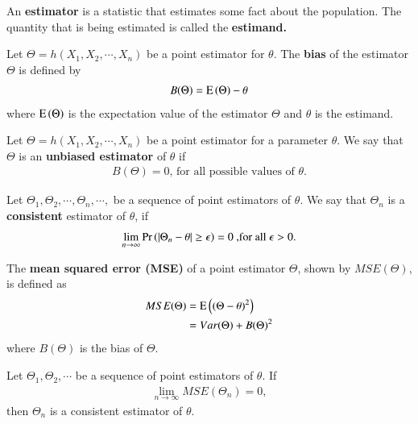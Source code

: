 \begin{definition}
    An \textbf{estimator} is a statistic that estimates some fact about the population.
    The quantity that is being estimated is called the \textbf{estimand.} 
    \end{definition}
    \begin{definition}
    Let $ \Theta = h(X_1,X_2, \cdots, X_n) $  be a point estimator for $ \theta$. The \textbf{bias} of the estimator $ \Theta $ is defined by 
    \begin{align}
        B(\Theta ) = \text{E}\left( \Theta \right) - \theta
    \end{align}
    where $ \text{E}\left( \Theta \right)$ is the expectation value of the estimator $ \Theta $ and $ \theta$ is the estimand.
    \end{definition}
        \begin{definition}
        Let $\Theta = h(X_1,X_2, \cdots , X_n) $ be a point estimator for a parameter $ \theta $. We say that $ \Theta $ is an \textbf{unbiased estimator} of $ \theta $ if
        \begin{align}
           B(\Theta )= 0 \text{, for all possible values of $\theta$.}
        \end{align}
        \end{definition} 
    \begin{definition}
    Let $ \Theta_1,\Theta_2, \cdots, \Theta_n , \cdots, $  be a sequence of point estimators of $ \theta $. We say that $ \Theta_n $ is a \textbf{consistent} estimator of $ \theta $, if 
    \begin{align}
        \lim_{n\to\infty} \Pr\left(| \Theta_n - \theta | \ge \epsilon\right) = 0 \text{ ,for all $ \epsilon > 0$.}
    \end{align}
    \end{definition}
    \begin{definition}
    The \textbf{mean squared error (MSE)} of a point estimator $ \Theta $, shown by $ MSE(\Theta) $, is defined as
    \begin{align}
        MSE(\Theta ) &= \text{E}\left( (\Theta - \theta)^2 \right) \\
        &= Var(\Theta) + B(\Theta)^2
    \end{align}
    where $ B(\Theta ) $ is the bias of $ \Theta $. 
    \end{definition}    
    \begin{theorem}
     Let $ \Theta_1,\Theta_2 , \cdots$ be a sequence of point estimators of $ \theta $. If
    \begin{align}
         \lim_{n\to\infty} MSE( \Theta_n) = 0,
    \end{align}
    then $ \Theta_n $ is a consistent estimator of $ \theta$.
    \end{theorem}
